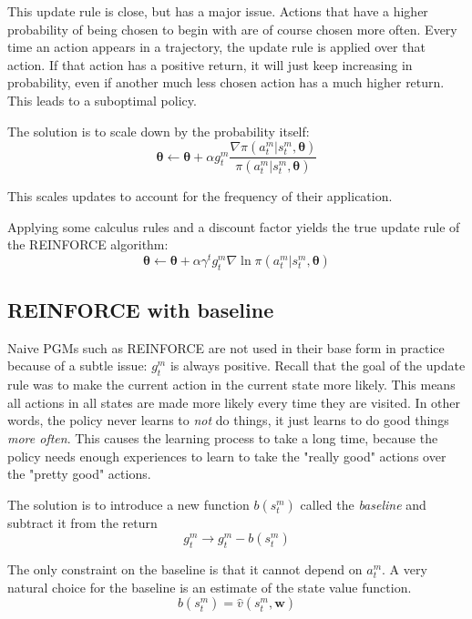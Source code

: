 \documentclass{article}
\begin{document}
This update rule is close, but has a major issue. Actions that have a higher probability of being chosen to begin with are of course 
chosen more often. Every time an action appears in a trajectory, the update rule is applied over that action. If that action has a positive return, 
it will just keep increasing in probability, even if another much less chosen action has a much higher return. This leads to a suboptimal policy.

The solution is to scale down by the probability itself:
\begin{equation}
  \bm{\theta} \leftarrow \bm{\theta} + \alpha g_t^m \frac{\nabla \pi(a_t^m|s_t^m, \bm{\theta})}{\pi(a_t^m|s_t^m, \bm{\theta})}
\end{equation}

This scales updates to account for the frequency of their application. 

Applying some calculus rules and a discount factor yields the true update rule of the REINFORCE algorithm:
\begin{equation}
  \bm{\theta} \leftarrow \bm{\theta} + \alpha \gamma^t g_t^m \nabla \ln \pi(a_t^m|s_t^m, \bm{\theta})
\end{equation}

\subsection{REINFORCE with baseline}
Naive PGMs such as REINFORCE are not used in their base form in practice because of a subtle issue: $g_t^m$ is always positive.
Recall that the goal of the update rule was to make the current action in the current state more likely. This means all actions in all states 
are made more likely every time they are visited. In other words, the policy never learns to \emph{not} do things, it just learns to do good things
\emph{more often}. This causes the learning process to take a long time, because the policy needs enough experiences to learn to take the "really good" actions 
over the "pretty good" actions.

The solution is to introduce a new function $b(s_t^m)$ called the \emph{baseline} and subtract it from the return
\begin{equation*}
  g_t^m \rightarrow g_t^m - b(s_t^m)
\end{equation*}

The only constraint on the baseline is that it cannot depend on $a_t^m$. 
A very natural choice for the baseline is an estimate of the state value function.
\begin{equation*}
  b(s_t^m) = \hat{v}(s_t^m, \bm{w})
\end{equation*}
\end{document}
